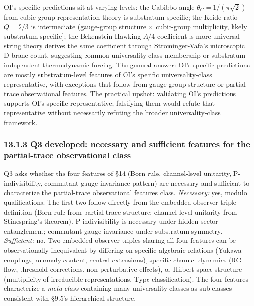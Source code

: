 \documentclass[
]{article}
\begin{document}
OI's specific predictions sit at varying levels: the Cabibbo angle
\(\theta_C = 1/(\pi\sqrt{2})\) from cubic-group representation theory is
substratum-specific; the Koide ratio \(Q = 2/3\) is intermediate
(gauge-group structure × cubic-group multiplicity, likely
substratum-specific); the Bekenstein-Hawking \(A/4\) coefficient is more
universal --- string theory derives the same coefficient through
Strominger-Vafa's microscopic D-brane count, suggesting common
universality-class membership or substratum-independent thermodynamic
forcing. The general answer: OI's specific predictions are mostly
substratum-level features of OI's specific universality-class
representative, with exceptions that follow from gauge-group structure
or partial-trace observational features. The practical upshot:
validating OI's predictions supports OI's specific representative;
falsifying them would refute that representative without necessarily
refuting the broader universality-class framework.

\hypertarget{q3-developed-necessary-and-sufficient-features-for-the-partial-trace-observational-class}{%
\subsubsection{13.1.3 Q3 developed: necessary and sufficient features
for the partial-trace observational
class}\label{q3-developed-necessary-and-sufficient-features-for-the-partial-trace-observational-class}}

Q3 asks whether the four features of §14 (Born rule, channel-level
unitarity, P-indivisibility, commutant gauge-invariance pattern) are
necessary and sufficient to characterize the partial-trace observational
features class. \emph{Necessary:} yes, modulo qualifications. The first
two follow directly from the embedded-observer triple definition (Born
rule from partial-trace structure; channel-level unitarity from
Stinespring's theorem). P-indivisibility is necessary under
hidden-sector entanglement; commutant gauge-invariance under substratum
symmetry. \emph{Sufficient:} no. Two embedded-observer triples sharing
all four features can be observationally inequivalent by differing on
specific algebraic relations (Yukawa couplings, anomaly content, central
extensions), specific channel dynamics (RG flow, threshold corrections,
non-perturbative effects), or Hilbert-space structure (multiplicity of
irreducible representations, Type classification). The four features
characterize a \emph{meta-class} containing many universality classes as
sub-classes --- consistent with §9.5's hierarchical structure.
\end{document}
